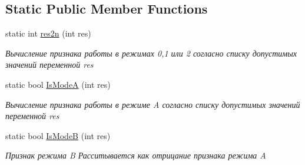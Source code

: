 \subsection*{Static Public Member Functions}
\begin{DoxyCompactItemize}
\item 
static int \hyperlink{class_c_v_i_engine_thread_a45d685448f47622c68e8f78593f7b69d}{res2n} (int res)
\begin{DoxyCompactList}\small\item\em Вычисление признака работы в режимах 0,1 или 2 согласно списку допустимых значений переменной res \end{DoxyCompactList}\item 
static bool \hyperlink{class_c_v_i_engine_thread_a85ffa17426e02ff2d5b03c5f37a1b0f8}{Is\+Mode\+A} (int res)
\begin{DoxyCompactList}\small\item\em Вычисление признака работы в режиме A согласно списку допустимых значений переменной res \end{DoxyCompactList}\item 
static bool \hyperlink{class_c_v_i_engine_thread_a4bbe730e3cd1bdadb1da99cce23fa8db}{Is\+Mode\+B} (int res)
\begin{DoxyCompactList}\small\item\em Признак режима B Расситывается как отрицание признака режима A \end{DoxyCompactList}\end{DoxyCompactItemize}
